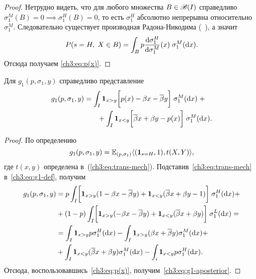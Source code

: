 {\begin{proof}
  Нетрудно видеть, что для любого множества $B \in \mathscr{B}(I)$ справедливо $\sigma^M_1(B) = 0 \implies \sigma^H_1(B) = 0$, то есть $\sigma^H_1$ абсолютно непрерывна относительно $\sigma^M_1$.
  Следовательно существует производная Радона-Никодима (\seename~\cite{kolmogorov-fomin}), а значит
  \begin{equation*}
    P(s = H, \; X \in B) =
    \int_B p \frac{\mathop{}\!\mathrm{d} \sigma^H_1}{\mathop{}\!\mathrm{d} \sigma^M_1}(x) \; \sigma^M_1(\mathop{}\!\mathrm{d} x).
  \end{equation*}
  Отсюда получаем \eqref{ch3:eq:p(x)}.
\end{proof}

\begin{proposition}
  Для $g_1(p, \sigma_1, y)$ справедливо представление
  \begin{equation}\label{ch3:eq:g1-aposterior}
    \begin{multlined}
      g_1(p, \sigma_1, y) = \int_I \Ind{x > y} \biggl[ p(x) - \Co x - \DCo y \biggr] \; \sigma^M_1(\di x) \; + \\
      + \int_I \Ind{x < y} \biggl[ \DCo x + \Co y - p(x) \biggr] \;
      \sigma^M_1(\di x).
    \end{multlined}
  \end{equation}
\end{proposition}
\begin{proof}
  По определению
  \begin{equation}\label{ch3:eq:g1-def}
    g_1(p, \sigma_1, y) = \operatorname{\mathbb{E}}_{( p, \sigma_1 )} \langle
    (\mathbf{1}_{s = H}, 1), t(X, Y)
    \rangle,
  \end{equation}
  где $t(x, y)$ определена в~(\ref{ch3:eq:trans-mech}).
  Подставив~\eqref{ch3:eq:trans-mech} в~\eqref{ch3:eq:g1-def}, получим
  \begin{align*}
    g_1(p, \sigma_1, y) 
    &= p \int_I \biggl[ \mathbf{1}_{x > y}(1 - \beta x - {{\overline{\beta}}} y) + \mathbf{1}_{x < y} ({{\overline{\beta}}} x + \beta y - 1) \biggr] \; \sigma^H_1(\mathop{}\!\mathrm{d} x) + \\
    &+ (1-p) \int_I \biggl[
      \mathbf{1}_{x > y} (- \beta x - {{\overline{\beta}}} y) + \mathbf{1}_{x < y}({{\overline{\beta}}} x + \beta y) 
    \biggr]
    \; \sigma^L_1(\mathop{}\!\mathrm{d} x) = \\
    &= \int_I \mathbf{1}_{x > y} p \sigma^H_1(\mathop{}\!\mathrm{d} x) -
    \int_I \mathbf{1}_{x > y} (\beta x + {{\overline{\beta}}} y) \sigma^M_1 (\mathop{}\!\mathrm{d} x) + \\
    &+ \int_I \mathbf{1}_{x < y} ({{\overline{\beta}}} x + \beta y) \sigma^M_1 (\mathop{}\!\mathrm{d} x) -
    \int_i \mathbf{1}_{x < y} p \sigma^H_1(\mathop{}\!\mathrm{d} x).
  \end{align*}
  Отсюда, воспользовавшись~\eqref{ch3:eq:p(x)}, получим~\eqref{ch3:eq:g1-aposterior}.
\end{proof}

}
